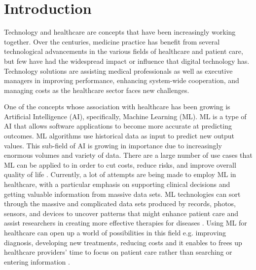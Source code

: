 \documentclass[journal]{IEEEtran} %
\begin{document}
\section{Introduction}
Technology and healthcare are concepts that have been increasingly working together. Over the centuries, medicine practice has benefit from several technological advancements in the various fields of healthcare and patient care, but few have had the widespread impact or influence that digital technology has. Technology solutions are assisting medical professionals as well as executive managers in improving performance, enhancing system-wide cooperation, and managing costs as the healthcare sector faces new challenges.

One of the concepts whose association with healthcare has been growing is Artificial Intelligence (AI), specifically, Machine Learning (ML). ML is a type of AI that allows software applications to become more accurate at predicting outcomes. ML algorithms use historical data as input to predict new output values. This sub-field of AI is growing in importance due to increasingly enormous volumes and variety of data. There are a large number of use cases that ML can be applied to in order to cut costs, reduce risks, and improve overall quality of life \cite{SearchEnterpriseAI2022}. Currently, a lot of attempts are being made to employ ML in healthcare, with a particular emphasis on supporting clinical decisions and getting valuable information from massive data sets. ML technologies can sort through the massive and complicated data sets produced by records, photos, sensors, and devices to uncover patterns that might enhance patient care and assist researchers in creating more effective therapies for diseases \cite{IBM}. Using ML for healthcare can open up a world of possibilities in this field e.g. improving diagnosis, developing new treatments, reducing costs and it enables to frees up healthcare providers’ time to focus on patient care rather than searching or entering information \cite{JAVAID202258}.
\end{document}
